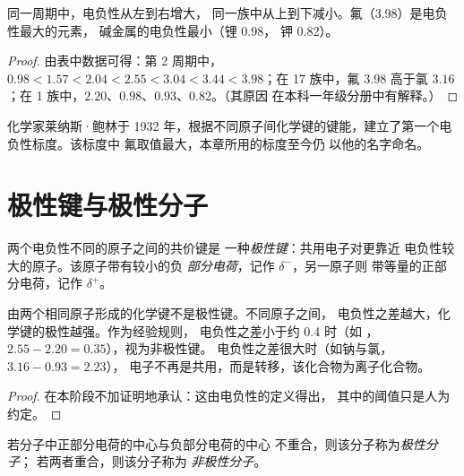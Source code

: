 \begin{proposition}[表中的变化规律]\label{prop:g11:polarity-and-cohesion:trends}
同一周期中，电负性从左到右增大，
同一族中从上到下减小。氟（3.98）是电负性最大的元素，
碱金属的电负性最小（锂 0.98，
钾 0.82）。
\end{proposition}

\begin{proof}
由表中数据可得：第 2 周期中，$0.98 < 1.57 < 2.04 < 2.55 < 3.04 <
3.44 < 3.98$；在 17 族中，氟 $3.98$ 高于氯
$3.16$；在 1 族中，$2.20$、$0.98$、$0.93$、$0.82$。（其原因
在本科一年级分册中有解释。）
\end{proof}

\begin{history}[鲍林标度，1932 年]
化学家莱纳斯·鲍林于
1932 年，根据不同原子间化学键的键能，建立了第一个电负性标度。该标度中
氟取值最大，本章所用的标度至今仍
以他的名字命名。
\end{history}

\section{极性键与极性分子}

\begin{definition}\label{def:g11:polarity-and-cohesion:polar-bond}
两个电负性不同的原子之间的共价键是
一种\emph{极性键}：共用电子对更靠近
电负性较大的原子。该原子带有较小的负
\emph{部分电荷}，记作 $\delta^-$，另一原子则
带等量的正部分电荷，记作 $\delta^+$。
\end{definition}

\begin{proposition}[何时为极性键？]\label{prop:g11:polarity-and-cohesion:polar-bond}
由两个相同原子形成的化学键不是极性键。不同原子之间，
电负性之差越大，化学键的极性越强。作为经验规则，
电负性之差小于约 0.4 时（如
，$2.55 - 2.20 = 0.35$），视为非极性键。
电负性之差很大时（如钠与氯，$3.16 - 0.93 = 2.23$），
电子不再是共用，而是转移，该化合物为离子化合物。
\end{proposition}

\begin{proof}
在本阶段不加证明地承认：这由电负性的定义得出，
其中的阈值只是人为约定。
\end{proof}

\begin{definition}[极性分子与非极性分子]\label{def:g11:polarity-and-cohesion:polar-molecule}
若分子中正部分电荷的中心与负部分电荷的中心
不重合，则该分子称为\emph{极性分子}；
若两者重合，则该分子称为
\emph{非极性分子}。
\end{definition}

